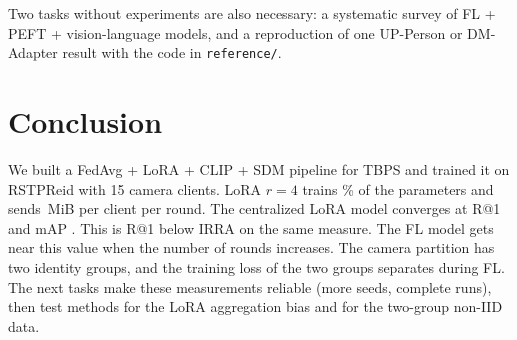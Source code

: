 Two tasks without experiments are also necessary: a systematic survey of FL + PEFT + vision-language models, and a reproduction of one UP-Person or DM-Adapter result with the code in \texttt{reference/}.

\section{Conclusion}\label{sec:conclusion}
We built a FedAvg + LoRA + CLIP + SDM pipeline for TBPS and trained it on RSTPReid with 15 camera clients. LoRA $r=4$ trains \numTrainPct\% of the parameters and sends \numUplinkLoRA\,MiB per client per round. The centralized LoRA model converges at R@1 \numCPlatR{} and mAP \numCPlatM. This is \numGapIrraConvR\pp{} R@1 below IRRA on the same measure. The FL model gets near this value when the number of rounds increases. The camera partition has two identity groups, and the training loss of the two groups separates during FL. The next tasks make these measurements reliable (more seeds, complete runs), then test methods for the LoRA aggregation bias and for the two-group non-IID data.
